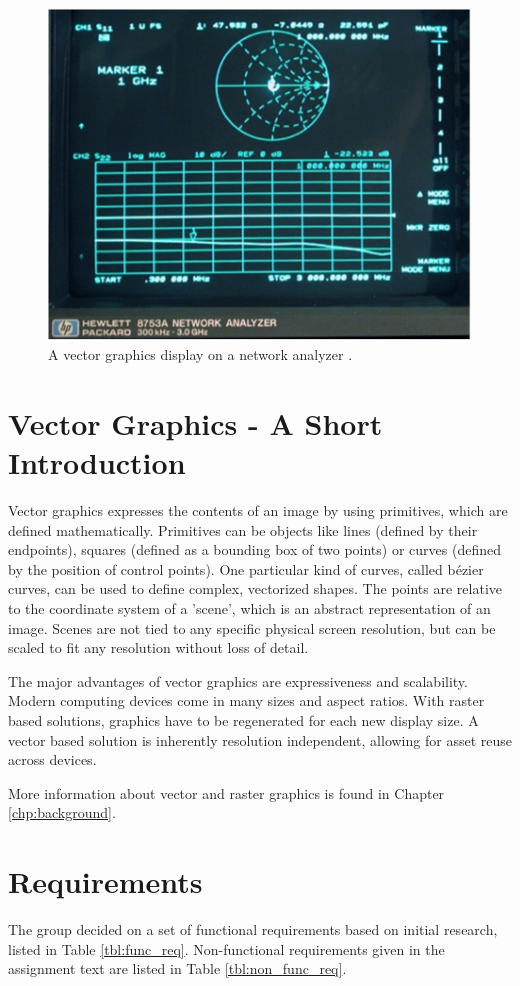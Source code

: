 \begin{figure}[h!]
    \centering
    \includegraphics[width=0.6\linewidth]{images/network-analyzer-vector-graphics-display.png}
    \caption{A vector graphics display on a network analyzer \cite{assignment-text}.}
    \label{fig:vector-display-network-analyzer}
\end{figure}

\section{Vector Graphics - A Short Introduction}
Vector graphics expresses the contents of an image by using primitives, which are defined mathematically.
Primitives can be objects like lines (defined by their endpoints), squares (defined as a bounding box of two points) or curves (defined by the position of control points).
One particular kind of curves, called bézier curves, can be used to define complex, vectorized shapes.
The points are relative to the coordinate system of a 'scene', which is an abstract representation of an image.
Scenes are not tied to any specific physical screen resolution, but can be scaled to fit any resolution without loss of detail.

The major advantages of vector graphics are expressiveness and scalability.
Modern computing devices come in many sizes and aspect ratios.
With raster based solutions, graphics have to be regenerated for each new display size.
A vector based solution is inherently resolution independent, allowing for asset reuse across devices.

More information about vector and raster graphics is found in Chapter \ref{chp:background}.

\section{Requirements}
\label{sec:requirements}
The group decided on a set of functional requirements based on initial research, listed in Table \ref{tbl:func_req}.
Non-functional requirements given in the assignment text are listed in Table \ref{tbl:non_func_req}.

